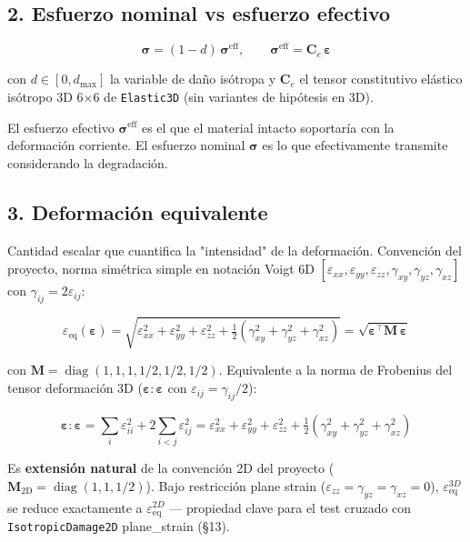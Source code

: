 \documentclass[11pt,letterpaper,oneside]{report}
\begin{document}
\subsection{2. Esfuerzo nominal vs esfuerzo efectivo}

\[
\boldsymbol\sigma = (1 - d)\,\boldsymbol\sigma^\text{eff}, \qquad \boldsymbol\sigma^\text{eff} = \mathbf C_e\,\boldsymbol\varepsilon
\]

con $d \in [0, d_\text{max}]$ la variable de daño isótropa y $\mathbf C_e$ el tensor constitutivo elástico isótropo 3D 6\ensuremath{\times}6 de \texttt{Elastic3D} (sin variantes de hipótesis en 3D).

El esfuerzo efectivo $\boldsymbol\sigma^\text{eff}$ es el que el material intacto soportaría con la deformación corriente. El esfuerzo nominal $\boldsymbol\sigma$ es lo que efectivamente transmite considerando la degradación.

\subsection{3. Deformación equivalente}

Cantidad escalar que cuantifica la "intensidad" de la deformación. Convención del proyecto, norma simétrica simple en notación Voigt 6D $[\varepsilon_{xx}, \varepsilon_{yy}, \varepsilon_{zz}, \gamma_{xy}, \gamma_{yz}, \gamma_{xz}]$ con $\gamma_{ij} = 2\varepsilon_{ij}$:

\[
\varepsilon_\text{eq}(\boldsymbol\varepsilon) = \sqrt{\varepsilon_{xx}^2 + \varepsilon_{yy}^2 + \varepsilon_{zz}^2 + \tfrac{1}{2}(\gamma_{xy}^2 + \gamma_{yz}^2 + \gamma_{xz}^2)} = \sqrt{\boldsymbol\varepsilon^\top \mathbf M\,\boldsymbol\varepsilon}
\]

con $\mathbf M = \operatorname{diag}(1, 1, 1, 1/2, 1/2, 1/2)$. Equivalente a la norma de Frobenius del tensor deformación 3D ($\boldsymbol\varepsilon : \boldsymbol\varepsilon$ con $\varepsilon_{ij} = \gamma_{ij}/2$):

\[
\boldsymbol\varepsilon:\boldsymbol\varepsilon = \sum_i \varepsilon_{ii}^2 + 2\sum_{i<j}\varepsilon_{ij}^2 = \varepsilon_{xx}^2 + \varepsilon_{yy}^2 + \varepsilon_{zz}^2 + \tfrac{1}{2}(\gamma_{xy}^2 + \gamma_{yz}^2 + \gamma_{xz}^2)
\]

Es \textbf{extensión natural} de la convención 2D del proyecto ($\mathbf M_\text{2D} = \operatorname{diag}(1, 1, 1/2)$). Bajo restricción plane strain ($\varepsilon_{zz} = \gamma_{yz} = \gamma_{xz} = 0$), $\varepsilon_\text{eq}^{3D}$ se reduce exactamente a $\varepsilon_\text{eq}^{2D}$ --- propiedad clave para el test cruzado con \texttt{IsotropicDamage2D} plane\_strain (§13).
\end{document}
